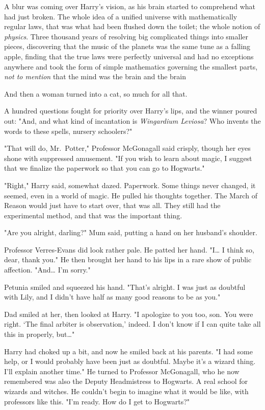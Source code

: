 {A blur was coming over Harry's vision, as his brain started to comprehend what
had just broken. The whole idea of a unified universe with mathematically
regular laws, that was what had been flushed down the toilet; the whole notion
of \emph{physics}. Three thousand years of resolving big complicated things
into smaller pieces, discovering that the music of the planets was the same
tune as a falling apple, finding that the true laws were perfectly universal
and had no exceptions anywhere and took the form of simple mathematics governing the
smallest parts, \emph{not to mention} that the mind was the brain and the brain

And then a woman turned into a cat, so much for all that.

A hundred questions fought for priority over Harry's lips, and the winner poured
out: "And, and what kind of incantation is \emph{Wingardium Leviosa}? Who
invents the words to these spells, nursery schoolers?"

"That will do, Mr.~Potter," Professor McGonagall said crisply, though her eyes
shone with suppressed amusement. "If you wish to learn about magic, I suggest
that we finalize the paperwork so that you can go to Hogwarts."

"Right," Harry said, somewhat dazed. Paperwork. Some things
never changed, it seemed, even in a world of magic.
He pulled his thoughts together. The March
of Reason would just have to start over, that was all.
They still had the experimental method, and that was the important thing.

"Are you alright, darling?" Mum said, putting a hand on her
husband's shoulder.

Professor Verres-Evans did look rather pale. He patted her
hand. "I{\ldots} I think so, dear, thank you." He then brought
her hand to his lips in a rare show of public affection.
"And{\ldots} I'm sorry."

Petunia smiled and squeezed his hand. "That's alright. I
was just as doubtful with Lily, and I didn't have half as
many good reasons to be as you."

Dad smiled at her, then looked at Harry. "I apologize to
you too, son. You were right. `The final arbiter is
observation,' indeed. I don't know if I can quite take all
this in properly, but{\ldots}"

Harry had choked up a bit, and now he smiled back at his
parents. "I had some help, or I would probably have been
just as doubtful. Maybe it's a wizard thing. I'll explain
another time." He turned to Professor McGonagall, who he
now remembered was also the Deputy Headmistress to
Hogwarts. A real school for wizards and witches. He
couldn't begin to imagine what it would be like, with
professors like this. "I'm ready. How do I get to Hogwarts?"

}
